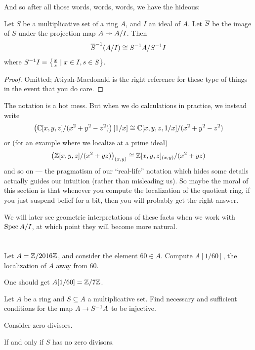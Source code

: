 And so after all those words, words, words, we have the hideous:
\begin{theorem}
	\label{thm:localization_commute_quotient}
	Let $S$ be a multiplicative set of a ring $A$,
	and $I$ an ideal of $A$.
	Let $\overline S$ be the image of $S$
	under the projection map $A \twoheadrightarrow A/I$.
	Then
	\[ {\overline S}^{-1} (A/I) \cong S^{-1} A / S^{-1} I \]
	where $S^{-1} I = \left\{ \frac{x}{s} \mid x \in I, s \in S \right\}$.
\end{theorem}
\begin{proof}
	Omitted; Atiyah-Macdonald is the right reference for these
	type of things in the event that you do care.
\end{proof}
The notation is a hot mess.
But when we do calculations in practice, we instead write
\[ \left( \mathbb C[x,y,z]/(x^2 + y^2 - z^2) \right)[1/x]
	\cong \mathbb C[x,y,z,1/x] / (x^2 + y^2 - z^2) \]
or (for an example where we localize at a prime ideal)
\[ \left( \mathbb Z[x,y,z]/ (x^2 + yz) \right)_{(x,y)}
	\cong \mathbb Z[x,y,z]_{(x,y)} / (x^2 + yz) \]
and so on --- the pragmatism of our ``real-life'' notation
which hides some details actually guides our intuition
(rather than misleading us).
So maybe the moral of this section is that whenever
you compute the localization of the quotient ring,
if you just suspend belief for a bit,
then you will probably get the right answer.

We will later see geometric interpretations of these facts
when we work with $\operatorname{Spec} A/I$,
at which point they will become more natural.

\section{\problemhead}
\begin{problem}
	Let $A = \mathbb Z/2016\mathbb Z$, and consider the element $60 \in A$.
	Compute $A[1/60]$, the localization of $A$ away from $60$.
	\begin{sol}
		One should get $A[1/60] = \mathbb Z/7\mathbb Z$.
	\end{sol}
\end{problem}

\begin{problem}
	Let $A$ be a ring and $S \subseteq A$ a multiplicative set.
	Find necessary and sufficient conditions
	for the map $A \to S^{-1} A$ to be injective.
	\begin{hint}
		Consider zero divisors.
	\end{hint}
	\begin{sol}
		If and only if $S$ has no zero divisors.
	\end{sol}
\end{problem}

